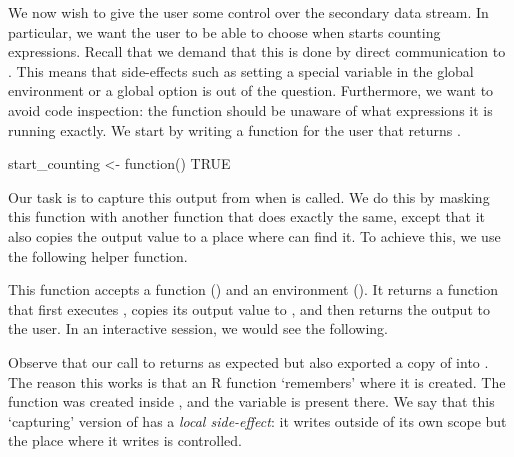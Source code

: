 We now wish to give the user some control over the secondary data stream.  In
particular, we want the user to be able to choose when  starts
counting expressions. Recall that we demand that this is done by direct
communication to . This means that side-effects such as setting a
special variable in the global environment or a global option is out of the
question. Furthermore, we want to avoid code inspection: the 
function should be unaware of what expressions it is running exactly.  We start
by writing a function for the user that returns .
\begin{example}
  start_counting <- function() TRUE
\end{example}
Our task is to capture this output from  when 
is called. We do this by masking this function  with another function that does
exactly the same, except that it also copies the output value to a place where
 can find it. To achieve this, we use the following helper function.
This function accepts a function () and an environment
(). It returns a function that first executes ,
copies its output value to , and then returns the output to the
user. In an interactive session, we would see the following.
Observe that our call to  returns  as expected but also
exported a copy of  into .  The reason this works is
that an R function `remembers' where it is created.  The function 
was created inside , and the variable  is present
there. We say that this `capturing' version of  has a
\emph{local side-effect}: it writes outside of its own scope but the place
where it writes is controlled.

